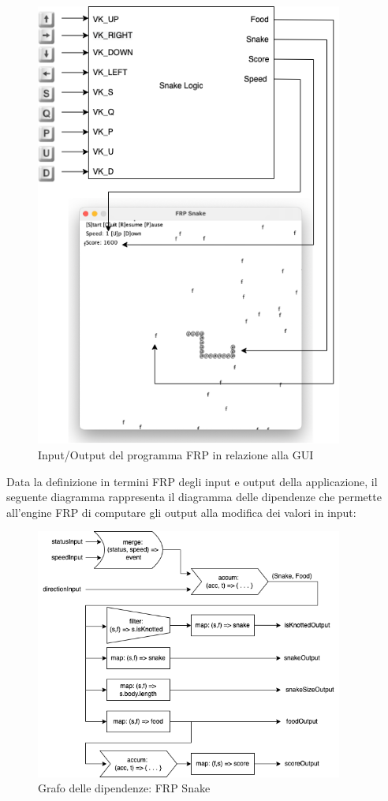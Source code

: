 \documentclass[../main.tex]{subfiles}
\begin{document}
\begin{figure}[H]
\centering
\includegraphics[width=0.9\textwidth]{img/frp-scala-Page-2.drawio.png}
\caption{Input/Output del programma FRP in relazione alla GUI}
\end{figure}

\newpage
Data la definizione in termini FRP degli input e output della applicazione, il seguente diagramma rappresenta il diagramma delle dipendenze che permette all'engine FRP di computare gli output alla modifica dei valori in input:
\begin{figure}[H]
\centering
\includegraphics[width=0.9\textwidth]{img/frp-scala-Page-5.drawio.png}
\caption{Grafo delle dipendenze: FRP Snake}
\end{figure}
\end{document}
